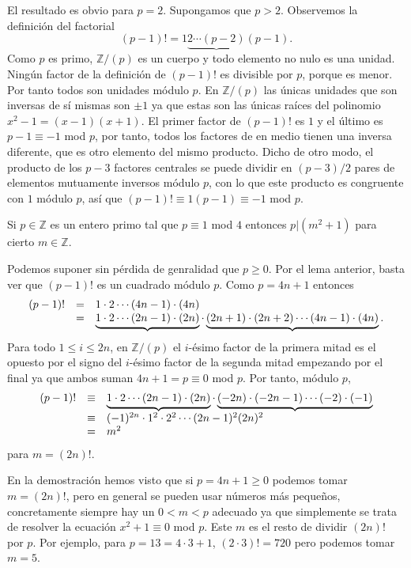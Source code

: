 El resultado es obvio para \(p=2\). Supongamos que \(p>2\). Observemos
la definición del factorial \[(p-1)!=1\underbrace{2\cdots (p-2)}(p-1).\]
Como \(p\) es primo, \(\mathbb Z/(p)\) es un cuerpo y todo elemento no
nulo es una unidad. Ningún factor de la definición de \((p-1)!\) es
divisible por \(p\), porque es menor. Por tanto todos son unidades
módulo \(p\). En \(\mathbb Z/(p)\) las únicas unidades que son inversas
de sí mismas son \(\pm 1\) ya que estas son las únicas raíces del
polinomio \(x^2-1=(x-1)(x+1)\). El primer factor de \((p-1)!\) es \(1\)
y el último es \(p-1\equiv -1\) mod \(p\), por tanto, todos los factores
de en medio tienen una inversa diferente, que es otro elemento del mismo
producto. Dicho de otro modo, el producto de los \(p-3\) factores
centrales se puede dividir en \((p-3)/2\) pares de elementos mutuamente
inversos módulo \(p\), con lo que este producto es congruente con \(1\)
módulo \(p\), así que \((p-1)!\equiv 1(p-1)\equiv -1\) mod \(p\).


Si \(p\in\mathbb Z\) es un entero primo tal que \(p\equiv 1\) mod \(4\)
entonces \(p|(m^2+1)\) para cierto \(m\in\mathbb Z\). 


Podemos suponer sin pérdida de genralidad que \(p\geq 0\). Por el lema
anterior, basta ver que \((p-1)!\) es un cuadrado módulo \(p\). Como
\(p=4n+1\) entonces
\[\begin{array}{rcl}(p-1)!&=&1\cdot 2\cdots (4n-1)\cdot (4n)\cr &=& \underbrace{1\cdot 2\cdots (2n-1)\cdot (2n)}\cdot \underbrace{(2n+1)\cdot (2n+2)\cdots (4n-1)\cdot (4n)}.\end{array}\]
Para todo \(1\leq i\leq 2n\), en \(\mathbb Z/(p)\) el \(i\)-ésimo factor
de la primera mitad es el opuesto por el signo del \(i\)-ésimo factor de
la segunda mitad empezando por el final ya que ambos suman
\(4n+1=p\equiv 0\) mod \(p\). Por tanto, módulo \(p\),
\[\begin{array}{rcl}(p-1)!&\equiv& \underbrace{1\cdot 2\cdots (2n-1)\cdot (2n)}\cdot \underbrace{(-2n)\cdot (-2n-1)\cdots (-2)\cdot (-1)}\cr&\equiv&(-1)^{2n}\cdot 1^2\cdot 2^2\cdots (2n-1)^2 (2n)^2\cr &=&m^2\end{array}\]
para \(m=(2n)!\). 


En la demostración hemos visto que si \(p=4n+1\geq 0\) podemos tomar
\(m=(2n)!\), pero en general se pueden usar números más pequeños,
concretamente siempre hay un \(0{<}m{<}p\) adecuado ya que simplemente
se trata de resolver la ecuación \(x^2+1\equiv 0\) mod \(p\). Este \(m\)
es el resto de dividir \((2n)!\) por \(p\). Por ejemplo, para
\(p=13=4\cdot 3+1\), \((2\cdot 3)!=720\) pero podemos tomar \(m=5\).

